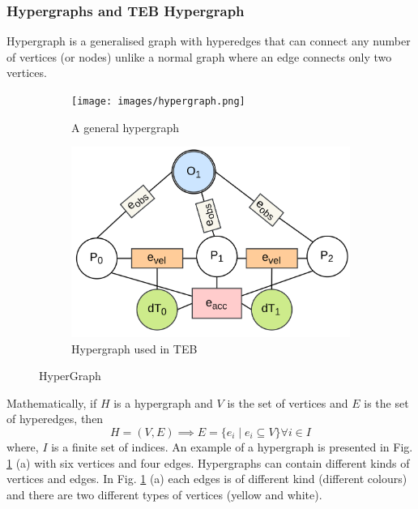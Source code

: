 \subsubsection{Hypergraphs and TEB Hypergraph}
Hypergraph is a generalised graph with hyperedges \cite{bretto2013hypergraph} that can connect any number of vertices (or nodes) unlike a normal graph where an edge connects only two vertices.
\begin{figure}[!h]
    \centering
    \begin{subfigure}[t]{0.45\columnwidth}
        \texttt{[image: images/hypergraph.png]}
    \caption{A general hypergraph}
    \end{subfigure}
     \begin{subfigure}[t]{0.45\columnwidth}
        \includegraphics[width=\textwidth]{images/hypergraph_teb.png}
    \caption{Hypergraph used in TEB}
    \end{subfigure}
    \caption{HyperGraph}
    \label{fig:hypergraph}
\end{figure}
Mathematically, if $H$ is a hypergraph and $V$ is the set of vertices and $E$ is the set of hyperedges, then
\begin{equation}
    H = (V, E) \implies E = \{e_i \mid e_i \subseteq V\} \forall i \in I
\end{equation}
where, $I$ is a finite set of indices. An example of a hypergraph is presented in Fig. \ref{fig:hypergraph} (a) with six vertices and four edges. Hypergraphs can contain different kinds of vertices and edges. In Fig. \ref{fig:hypergraph} (a) each edges is of different kind (different colours) and there are two different types of vertices (yellow and white). 


